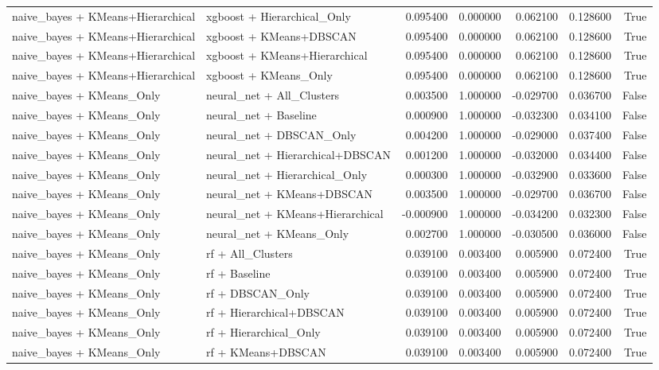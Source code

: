 \begin{tabular}{llrrrrr}
naive_bayes + KMeans+Hierarchical & xgboost + Hierarchical_Only & 0.095400 & 0.000000 & 0.062100 & 0.128600 & True \\
naive_bayes + KMeans+Hierarchical & xgboost + KMeans+DBSCAN & 0.095400 & 0.000000 & 0.062100 & 0.128600 & True \\
naive_bayes + KMeans+Hierarchical & xgboost + KMeans+Hierarchical & 0.095400 & 0.000000 & 0.062100 & 0.128600 & True \\
naive_bayes + KMeans+Hierarchical & xgboost + KMeans_Only & 0.095400 & 0.000000 & 0.062100 & 0.128600 & True \\
naive_bayes + KMeans_Only & neural_net + All_Clusters & 0.003500 & 1.000000 & -0.029700 & 0.036700 & False \\
naive_bayes + KMeans_Only & neural_net + Baseline & 0.000900 & 1.000000 & -0.032300 & 0.034100 & False \\
naive_bayes + KMeans_Only & neural_net + DBSCAN_Only & 0.004200 & 1.000000 & -0.029000 & 0.037400 & False \\
naive_bayes + KMeans_Only & neural_net + Hierarchical+DBSCAN & 0.001200 & 1.000000 & -0.032000 & 0.034400 & False \\
naive_bayes + KMeans_Only & neural_net + Hierarchical_Only & 0.000300 & 1.000000 & -0.032900 & 0.033600 & False \\
naive_bayes + KMeans_Only & neural_net + KMeans+DBSCAN & 0.003500 & 1.000000 & -0.029700 & 0.036700 & False \\
naive_bayes + KMeans_Only & neural_net + KMeans+Hierarchical & -0.000900 & 1.000000 & -0.034200 & 0.032300 & False \\
naive_bayes + KMeans_Only & neural_net + KMeans_Only & 0.002700 & 1.000000 & -0.030500 & 0.036000 & False \\
naive_bayes + KMeans_Only & rf + All_Clusters & 0.039100 & 0.003400 & 0.005900 & 0.072400 & True \\
naive_bayes + KMeans_Only & rf + Baseline & 0.039100 & 0.003400 & 0.005900 & 0.072400 & True \\
naive_bayes + KMeans_Only & rf + DBSCAN_Only & 0.039100 & 0.003400 & 0.005900 & 0.072400 & True \\
naive_bayes + KMeans_Only & rf + Hierarchical+DBSCAN & 0.039100 & 0.003400 & 0.005900 & 0.072400 & True \\
naive_bayes + KMeans_Only & rf + Hierarchical_Only & 0.039100 & 0.003400 & 0.005900 & 0.072400 & True \\
naive_bayes + KMeans_Only & rf + KMeans+DBSCAN & 0.039100 & 0.003400 & 0.005900 & 0.072400 & True \\

\end{tabular}
